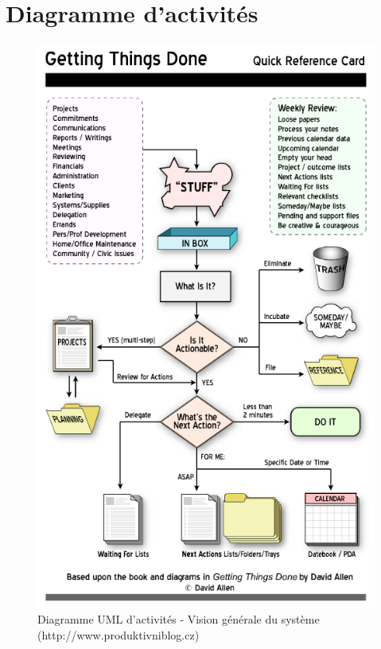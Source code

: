 \chapter{Diagramme d'activités}

\begin{figure}[H]
\begin{center}
\includegraphics[scale=0.44]{diagrams/gtd-flow-chart.png}
\caption{Diagramme UML d'activités - Vision générale du système (http://www.produktivniblog.cz)}
\end{center}
\end{figure}

